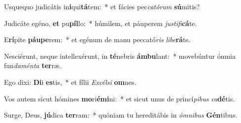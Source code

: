 \item Usquequo judicátis in\textbf{i}qui\textbf{tá}tem:~* et fácies pec\textit{ca}\textit{tó}\textit{rum} \textbf{sú}mitis?
\item Judicáte egéno, \textbf{et} pu\textbf{píl}lo:~* húmilem, et páuperem \textit{jus}\textit{ti}\textit{fi}\textbf{cá}te.
\item E\textbf{rí}pite \textbf{páu}\textbf{pe}rem:~* et egénum de manu peccató\textit{ris} \textit{li}\textit{be}\textbf{rá}te.
\item Nesciérunt, neque intellexérunt, in \textbf{té}nebris \textbf{ám}\textbf{bu}lant:~* movebúntur ómnia fun\textit{da}\textit{mén}\textit{ta} \textbf{ter}ræ.
\item Ego dixi: \textbf{Di}i \textbf{es}tis,~* et fílii \textit{Ex}\textit{cél}\textit{si} \textbf{om}nes.
\item Vos autem sicut hómines \textbf{mo}ri\textbf{é}\textbf{mi}ni:~* et sicut unus de princí\textit{pi}\textit{bus} \textit{ca}\textbf{dé}tis.
\item Surge, Deus, \textbf{jú}dica \textbf{ter}ram:~* quóniam tu hereditábis in \textit{óm}\textit{ni}\textit{bus} \textbf{Gén}tibus.

